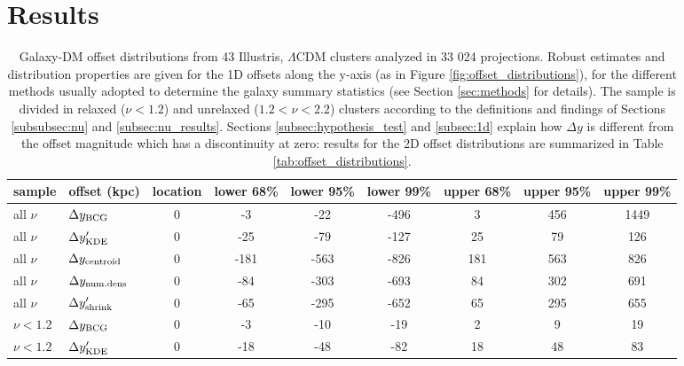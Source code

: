 \documentclass[usenatbib]{mn2e}
\begin{document}
{\section{Results} 
\label{sec:results}

\begin{table*}
	\begin{center}
		\caption{Galaxy-DM offset distributions from 43 Illustris, $\Lambda$CDM clusters analyzed in 33 024 projections. Robust estimates and distribution properties are given for the 1D offsets along the y-axis (as in Figure \ref{fig:offset_distributions}), for the different methods usually adopted to determine the galaxy summary statistics (see Section \ref{sec:methods} for details). The sample is divided in relaxed ($\nu < 1.2$) and unrelaxed ($1.2 < \nu < 2.2$) clusters according to the definitions and findings of Sections \ref{subsubsec:nu} and \ref{subsec:nu_results}. Sections \ref{subsec:hypothesis_test} and \ref{subsec:1d} explain how $\Delta y$ is different from the offset magnitude which has a discontinuity at zero: results for the 2D offset distributions are summarized in Table \ref{tab:offset_distributions}.
		\label{tab:p_val_table}
	}
	\begin{tabular}{llccccccc}
\toprule
sample & offset (kpc) &  location &  lower 68\% &  lower 95\% &  lower 99\% &  upper 68\% &  upper 95\% &  upper 99\% \\
\midrule
all $\nu$ & $\Delta y_{\rm BCG}$               &         0 &          -3 &         -22 &        -496 &           3 &         456 &        1449 \\
all $\nu$ & $\Delta y_{\rm KDE}'$              &         0 &         -25 &         -79 &        -127 &          25 &          79 &         126 \\
all $\nu$ & $\Delta y_{\rm centroid}$     &  0 &         -181 &-563 &        -826 &          181&         563&         826\\
all $\nu$ & $\Delta y_{\rm num. dens}$         &        0 &         -84 &        -303 &        -693 &          84 &         302 &         691 \\
all $\nu$ & $\Delta y_{\rm shrink}'$           &        0 &         -65 &        -295 &        -652 &          65 &         295 &         655 \\
\midrule
$\nu < 1.2$ & $\Delta y_{\rm BCG}$             &        0 &          -3 &         -10 &         -19 &           2 &           9 &          19 \\
$\nu < 1.2$ & $\Delta y_{\rm KDE}'$            &         0 &         -18 &         -48 &         -82 &          18 &          48 &          83 \\

\end{tabular}
\end{center}
\end{table*}}
\end{document}
